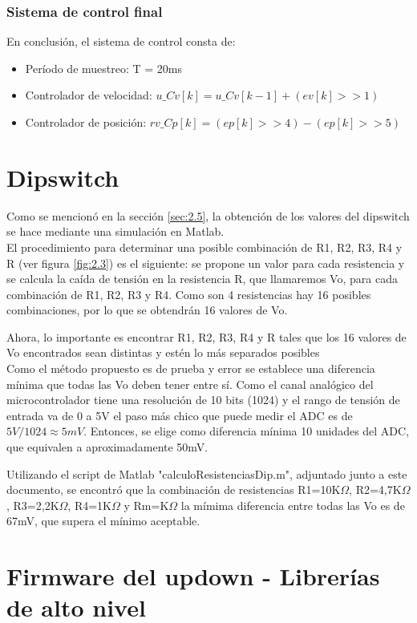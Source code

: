 \subsubsection{Sistema de control final}

En conclusión, el sistema de control consta de:
\begin{itemize}
	\item Período de muestreo: T = 20ms
	\item Controlador de velocidad: \(u\_Cv[k] = u\_Cv[k-1] + (ev[k] >> 1)\)
	\item Controlador de posición: \(rv\_Cp[k] = (ep[k] >> 4) - (ep[k] >> 5)\)
\end{itemize}


\section{Dipswitch} \label{sec:\thesection}
Como se mencionó en la sección \ref{sec:2.5}, la obtención de los valores del dipswitch se hace mediante una simulación en Matlab.\\
El procedimiento para determinar una posible combinación de R1, R2, R3, R4 y R (ver figura \ref{fig:2.3}) es el siguiente: se propone un valor para cada resistencia y se calcula la caída de tensión en la resistencia R, que llamaremos Vo, para cada combinación de R1, R2, R3 y R4. Como son 4 resistencias hay 16 posibles combinaciones, por lo que se obtendrán 16 valores de Vo. 

Ahora, lo importante es encontrar R1, R2, R3, R4 y R tales que los 16 valores de Vo encontrados sean distintas y estén lo más separados posibles\\
Como el método propuesto es de prueba y error se establece una diferencia mínima que todas las Vo deben tener entre sí. Como el canal analógico del microcontrolador tiene una resolución de 10 bits (1024) y el rango de tensión de entrada va de 0 a 5V el paso más chico que puede medir el ADC es de \(5V/1024 \approx 5mV\). Entonces, se elige como diferencia mínima 10 unidades del ADC, que equivalen a aproximadamente 50mV.

\textcolor{FIXME}{Utilizando el script de Matlab "calculoResistenciasDip.m", adjuntado junto a este documento,} se encontró que la combinación de resistencias R1=10K\(\Omega\), R2=4,7K\(\Omega\), R3=2,2K\(\Omega\), R4=1K\(\Omega\) y Rm=K\(\Omega\) la mímima diferencia entre todas las Vo es de 67mV, que supera el mínimo aceptable.


\section{Firmware del updown - Librerías de alto nivel} \label{sec:\thesection}

